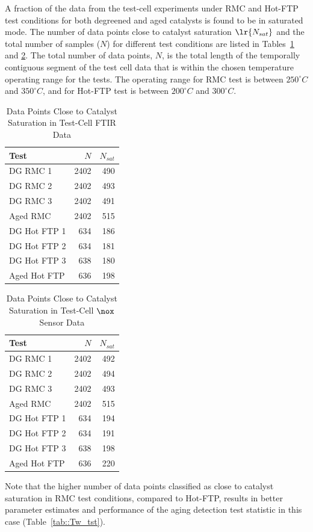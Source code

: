 A fraction of the data from the test-cell experiments under RMC and Hot-FTP test conditions for both degreened and aged
catalysts is found to be in saturated mode. The number of data points close to catalyst saturation $\lr{N_{sat}}$ and
the total number of samples ($N$) for different test conditions are listed in Tables~\ref{tab::sat_data_perc_ssd} and
\ref{tab::sat_data_perc_iod}. The total number of data points, $N$, is the total length of the temporally contiguous
segment of the test cell data that is within the chosen temperature operating range for the tests. The operating range
for RMC test is between $250^\circ C$ and $350^\circ C$, and for Hot-FTP test is between $200^\circ C$ and $300^\circ
C$.
\begin{table}[ht]
        \centering
        \caption{Data Points Close to Catalyst Saturation in Test-Cell FTIR Data}
        \label{tab::sat_data_perc_ssd}
        \begin{tabular}{l r r}
                \hline \hline
                Test & $N$ & $N_{sat}$ \\\hline \hline
                DG RMC 1  & 2402 & 490  \\
                DG RMC 2  & 2402 & 493  \\
                DG RMC 3  & 2402 & 491  \\
                Aged RMC  & 2402 & 515  \\ \hline
                DG Hot FTP 1 & 634 & 186  \\
                DG Hot FTP 2 & 634 & 181  \\
                DG Hot FTP 3 & 638 & 180  \\
                Aged Hot FTP & 636 & 198  \\
                \hline\hline
        \end{tabular}
\end{table}
\begin{table}[ht]
        \centering
        \caption{Data Points Close to Catalyst Saturation in Test-Cell $\nox$ Sensor Data}
        \label{tab::sat_data_perc_iod}
        \begin{tabular}{l r r}
                \hline \hline
                Test & $N$ & $N_{sat}$ \\\hline \hline
                DG RMC 1  & 2402 & 492  \\
                DG RMC 2  & 2402 & 494  \\
                DG RMC 3  & 2402 & 493  \\
                Aged RMC  & 2402 & 515  \\ \hline
                DG Hot FTP 1 & 634 & 194  \\
                DG Hot FTP 2 & 634 & 191  \\
                DG Hot FTP 3 & 638 & 198  \\
                Aged Hot FTP & 636 & 220  \\
                \hline\hline
        \end{tabular}
\end{table}
Note that the higher number of data points classified as close to catalyst saturation in RMC test conditions, compared
to Hot-FTP, results in better parameter estimates and performance of the aging detection test statistic in this case
(Table~\ref{tab::Tw_tst}).
